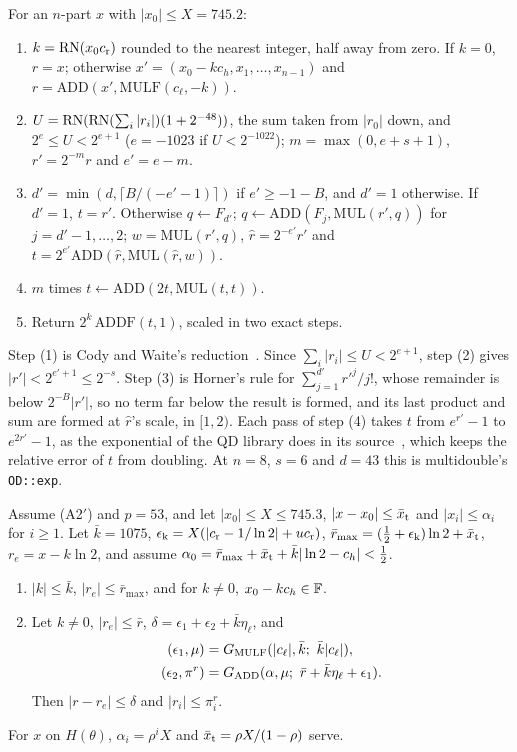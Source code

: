  For an $n$-part $x$ with $|x_0| \le X = 745.2$:
\begin{enumerate}
\item[(1)] $k = \mathrm{RN}(x_0c_{\rm r})$ rounded to the nearest integer, half away from zero. If $k = 0$, $r = x$; otherwise
  $x' = (x_0 - kc_h, x_1, \dots, x_{n-1})$ and $r = \mathrm{ADD}(x', \mathrm{MULF}(c_\ell, -k))$.
\item[(2)] $U = \mathrm{RN}(\mathrm{RN}(\sum_i|r_i|)(1 + 2^{-48}))$, the sum taken from $|r_0|$ down, and $2^e \le U < 2^{e+1}$
  ($e = -1023$ if $U < 2^{-1022}$); $m = \max(0, e + s + 1)$, $r' = 2^{-m}r$ and $e' = e - m$.
\item[(3)] $d' = \min(d, \lceil B/(-e'-1)\rceil)$ if $e' \ge -1 - B$, and $d' = 1$ otherwise. If $d' = 1$, $t = r'$.
  Otherwise $q \gets F_{d'}$; $q \gets \mathrm{ADD}(F_j, \mathrm{MUL}(r', q))$ for $j = d'-1, \dots, 2$; $w =
  \mathrm{MUL}(r', q)$, $\hat r = 2^{-e'}r'$ and $t = 2^{e'}\mathrm{ADD}(\hat r, \mathrm{MUL}(\hat r, w))$.
\item[(4)] $m$ times $t \gets \mathrm{ADD}(2t, \mathrm{MUL}(t, t))$.
\item[(5)] Return $2^k\,\mathrm{ADDF}(t, 1)$, scaled in two exact steps.
\end{enumerate}
Step (1) is Cody and Waite's reduction~\cite{CW80}. Since $\sum_i|r_i| \le U < 2^{e+1}$, step (2) gives $|r'| <
2^{e'+1} \le 2^{-s}$. Step (3) is Horner's rule for $\sum_{j=1}^{d'}r'^j/j!$, whose remainder is below $2^{-B}|r'|$, so
no term far below the result is formed, and its last product and sum are formed at $\hat r$'s scale, in $[1, 2)$. Each
pass of step (4) takes $t$ from $e^{r'} - 1$ to $e^{2r'} - 1$, as the exponential of the QD library does in its
source~\cite{QD237}, which keeps the relative error of $t$ from doubling. At $n = 8$, $s = 6$ and $d = 43$ this is
multidouble's \texttt{OD::exp}.

\begin{lemma}\label{lem:expred}
Assume (A2$'$) and $p = 53$, and let $|x_0| \le X \le 745.3$, $|x - x_0| \le \bar x_{\rm t}$ and $|x_i| \le \alpha_i$ for $i
\ge 1$. Let $\bar k = 1075$, $\epsilon_{\rm k} = X(|c_{\rm r} - 1/\ln 2| + uc_{\rm r})$, $\bar r_{\max} = (\frac12 + \epsilon_{\rm k})\ln 2 + \bar x_{\rm t}$, $r_e =
x - k\ln 2$, and assume $\alpha_0 = \bar r_{\max} + \bar x_{\rm t} + \bar k|\ln 2 - c_h| < \frac12$.
\begin{enumerate}
\item[(a)] $|k| \le \bar k$, $|r_e| \le \bar r_{\max}$, and for $k \ne 0$, $x_0 - kc_h \in \mathbb{F}$.
\item[(b)] Let $k \ne 0$, $|r_e| \le \bar r$, $\delta = \epsilon_1 + \epsilon_2 + \bar k\eta_\ell$, and
  \begin{align*}
  (\epsilon_1, \mu) &= G_{\rm MULF}(|c_\ell|, \bar k;\ \bar k|c_\ell|), \\
  (\epsilon_2, \pi^r) &= G_{\rm ADD}(\alpha, \mu;\ \bar r + \bar k\eta_\ell + \epsilon_1).
  \end{align*}
  Then $|r - r_e| \le \delta$ and $|r_i| \le \pi^r_i$.
\end{enumerate}
For $x$ on $H(\theta)$, $\alpha_i = \rho^iX$ and $\bar x_{\rm t} = \rho X/(1-\rho)$ serve.
\end{lemma}

